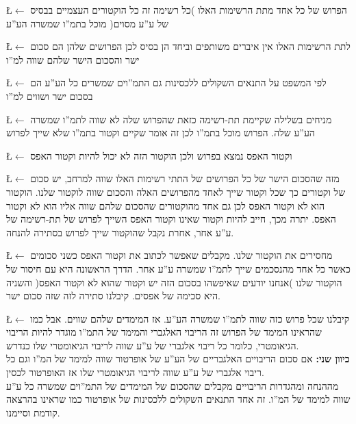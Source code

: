 \documentclass[english,hebrew]{article}
\begin{document}
\L{$\leftarrow$} הפרוש של כל אחד מתת הרשימות האלו )כל רשימה זה כל
הוקטורים העצמיים בבסיס של ע\textquotedblright ע מסוים( מוכל בתמ\textquotedblright ו
שמשרה הע\textquotedblright ע

\L{$\leftarrow$} לתת הרשימות האלו אין איברים משותפים וביחד הן בסיס
לכן הפרושים שלהן הם סכום ישר והסכום הישר שלהם שווה למ\textquotedblright ו 

\L{$\leftarrow$} לפי המשפט על התנאים השקולים ללכסינות גם התמ\textquotedblright וים
שמשרים כל הע\textquotedblright ע הם בסכום ישר ושווים למ\textquotedblright ו 

\L{$\leftarrow$} מניחים בשלילה שקיימת תת-רשימה כזאת שהפרוש שלה לא
שווה לתמ\textquotedblright ו שמשרה הע\textquotedblright ע שלה. הפרוש
מוכל בתמ\textquotedblright ו לכן זה אומר שקיים וקטור בתמ\textquotedblright ו
שלא שייך לפרוש

\L{$\leftarrow$} וקטור האפס נמצא בפרוש ולכן הוקטור הזה לא יכול להיות
וקטור האפס 

\L{$\leftarrow$} מזה שהסכום הישר של כל הפרושים של התתי רשימות האלו
שווה למרחב, יש סכום של וקטורים כך שכל וקטור שייך לאחד מהפרושים האלה
והסכום שווה לוקטור שלנו. הוקטור הוא לא וקטור האפס לכן גם אחד מהוקטורים
שהסכום שלהם שווה אליו הוא לא וקטור האפס. יתרה מכך, חייב להיות וקטור
שאינו וקטור האפס השייך לפרוש של תת-רשימה של ע\textquotedblright ע
אחר, אחרת נקבל שהוקטור שייך לפרוש בסתירה להנחה.

\L{$\leftarrow$} מחסירים את הוקטור שלנו. מקבלים שאפשר לכתוב את וקטור
האפס כשני סכומים כאשר כל אחד מהנסכמים שייך לתמ\textquotedblright ו
שמשרה ע\textquotedblright ע אחר. הדרך הראשונה היא עם חיסור של הוקטור
שלנו )אנחנו יודעים שאיפשהו בסכום הזה יש וקטור שהוא לא וקטור האפס(
והשניה היא סכימה של אפסים. קיבלנו סתירה לזה שזה סכום ישר. 

\L{$\leftarrow$} קיבלנו שכל פרוש כזה שווה לתמ\textquotedblright ו
שמשרה הע\textquotedblright ע. אז המימדים שלהם שווים. אבל כמו שהראינו
המימד של הפרוש זה הריבוי האלגברי והמימד של התמ\textquotedblright ו
מוגדר להיות הריבוי הגיאומטרי, כלומר כל ריבוי אלגברי של ע\textquotedblright ע
שווה לריבוי הגיאומטרי שלו כנדרש.\\

\textbf{כיוון שני:} אם סכום הריבויים האלגבריים של הע\textquotedblright ע
של אופרטור שווה למימד של המ\textquotedblright ו וגם כל ריבוי אלגברי
של ע\textquotedblright ע שווה לריבוי הגיאומטרי שלו אז האופרטור לכסין.\\

מההנחה ומהגדרות הריבויים מקבלים שהסכום של המימדים של התמ\textquotedblright וים
שמשרה כל ע\textquotedblright ע שווה למימד של המ\textquotedblright ו.
זה אחד התנאים השקולים ללכסינות של אופרטור כמו שראינו בהרצאה קודמת
וסיימנו.
\end{document}
